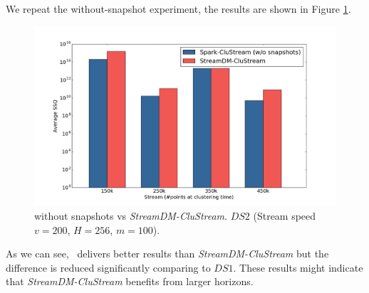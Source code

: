 We repeat the without-snapshot experiment, the results are shown in Figure \ref{fig:comparisonNoSnaps2}.
\begin{figure}[h]
 \centering
 \includegraphics[scale=0.24]{./styles/comparisonNoSnaps2.png}
  \caption{\our without snapshots vs \textit{StreamDM-CluStream}. $DS2$ (Stream speed $v=200$, $H=256$, $m=100$).}
 \label{fig:comparisonNoSnaps2}
\end{figure}
As we can see, \our~delivers better results than \textit{StreamDM-CluStream} but the difference is reduced significantly comparing to $DS1$. These results might indicate that \textit{StreamDM-CluStream}  benefits from larger horizons.





